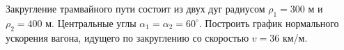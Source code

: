 Закругление трамвайного пути состоит из двух дуг радиусом $\rho_1=300$ м
и $\rho_2=400$ м. Центральные углы $\alpha_1=\alpha_2=60^\circ$.
Построить график нормального ускорения вагона, идущего по закруглению со
скоростью $v=36$ км/м.
